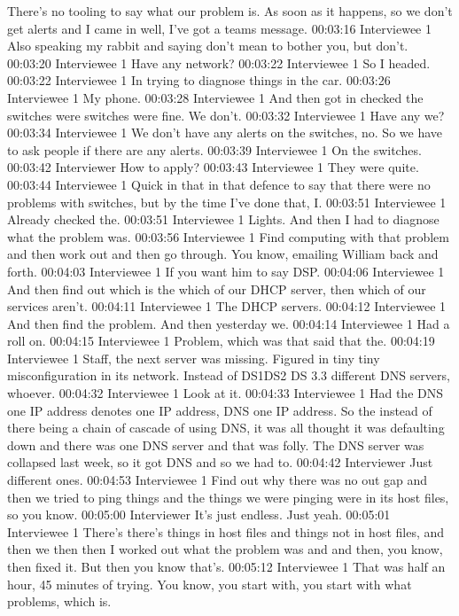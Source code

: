 There's no tooling to say what our problem is. As soon as it happens, so we don't get alerts and I came in well, I've got a teams message.
00:03:16 Interviewee 1
Also speaking my rabbit and saying don't mean to bother you, but don't.
00:03:20 Interviewee 1
Have any network?
00:03:22 Interviewee 1
So I headed.
00:03:22 Interviewee 1
In trying to diagnose things in the car.
00:03:26 Interviewee 1
My phone.
00:03:28 Interviewee 1
And then got in checked the switches were switches were fine. We don't.
00:03:32 Interviewee 1
Have any we?
00:03:34 Interviewee 1
We don't have any alerts on the switches, no. So we have to ask people if there are any alerts.
00:03:39 Interviewee 1
On the switches.
00:03:42 Interviewer
How to apply?
00:03:43 Interviewee 1
They were quite.
00:03:44 Interviewee 1
Quick in that in that defence to say that there were no problems with switches, but by the time I've done that, I.
00:03:51 Interviewee 1
Already checked the.
00:03:51 Interviewee 1
Lights. And then I had to diagnose what the problem was.
00:03:56 Interviewee 1
Find computing with that problem and then work out and then go through. You know, emailing William back and forth.
00:04:03 Interviewee 1
If you want him to say DSP.
00:04:06 Interviewee 1
And then find out which is the which of our DHCP server, then which of our services aren't.
00:04:11 Interviewee 1
The DHCP servers.
00:04:12 Interviewee 1
And then find the problem. And then yesterday we.
00:04:14 Interviewee 1
Had a roll on.
00:04:15 Interviewee 1
Problem, which was that said that the.
00:04:19 Interviewee 1
Staff, the next server was missing. Figured in tiny tiny misconfiguration in its network. Instead of DS1DS2 DS 3.3 different DNS servers, whoever.
00:04:32 Interviewee 1
Look at it.
00:04:33 Interviewee 1
Had the DNS one IP address denotes one IP address, DNS one IP address. So the instead of there being a chain of cascade of using DNS, it was all thought it was defaulting down and there was one DNS server and that was folly. The DNS server was collapsed last week, so it got DNS and so we had to.
00:04:42 Interviewer
Just different ones.
00:04:53 Interviewee 1
Find out why there was no out gap and then we tried to ping things and the things we were pinging were in its host files, so you know.
00:05:00 Interviewer
It's just endless. Just yeah.
00:05:01 Interviewee 1
There's there's things in host files and things not in host files, and then we then then I worked out what the problem was and and then, you know, then fixed it. But then you know that's.
00:05:12 Interviewee 1
That was half an hour, 45 minutes of trying. You know, you start with, you start with what problems, which is.
